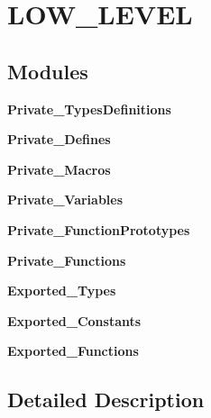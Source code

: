 \section{L\+O\+W\+\_\+\+L\+E\+V\+EL}
\label{group___l_o_w___l_e_v_e_l}
\subsection*{Modules}
\begin{DoxyCompactItemize}
\item 
\textbf{ Private\+\_\+\+Types\+Definitions}
\item 
\textbf{ Private\+\_\+\+Defines}
\item 
\textbf{ Private\+\_\+\+Macros}
\item 
\textbf{ Private\+\_\+\+Variables}
\item 
\textbf{ Private\+\_\+\+Function\+Prototypes}
\item 
\textbf{ Private\+\_\+\+Functions}
\item 
\textbf{ Exported\+\_\+\+Types}
\item 
\textbf{ Exported\+\_\+\+Constants}
\item 
\textbf{ Exported\+\_\+\+Functions}
\end{DoxyCompactItemize}


\subsection{Detailed Description}
